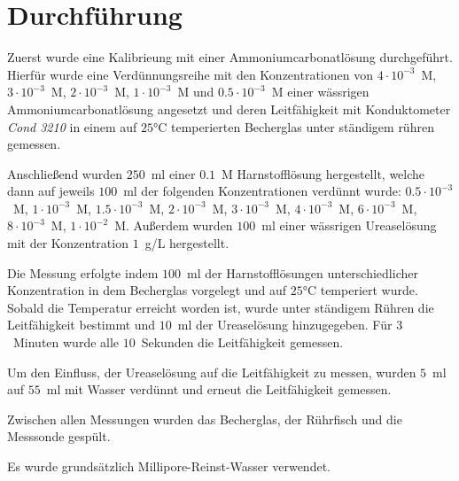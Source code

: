 
 
%
\section{Durchführung}

Zuerst wurde eine Kalibrieung mit einer Ammoniumcarbonatlösung durchgeführt. Hierfür wurde eine Verdünnungsreihe mit den Konzentrationen von $4 \cdot 10^{-3}$~M, $3 \cdot 10^{-3}$~M, $2 \cdot 10^{-3}$~M, $1 \cdot 10^{-3}$~M und $0.5 \cdot 10^{-3}$~M einer wässrigen Ammoniumcarbonatlösung angesetzt und deren Leitfähigkeit mit Konduktometer \textit{Cond 3210} in einem auf $25$°C temperierten Becherglas unter ständigem rühren gemessen.

Anschließend wurden $250$~ml einer $0.1$~M Harnstofflösung hergestellt, welche dann auf jeweils $100$~ml der folgenden Konzentrationen verdünnt wurde:
$0.5 \cdot 10^{-3}$~M, $1 \cdot 10^{-3}$~M, $1.5 \cdot 10^{-3}$~M, $2 \cdot 10^{-3}$~M, $3 \cdot 10^{-3}$~M, $4 \cdot 10^{-3}$~M, $6 \cdot 10^{-3}$~M, $8 \cdot 10^{-3}$~M,  $1 \cdot 10^{-2}$~M. Außerdem wurden $100$~ml einer wässrigen Ureaselösung mit der Konzentration $1$~g/L hergestellt.

Die Messung erfolgte indem $100$~ml der Harnstofflösungen unterschiedlicher Konzentration in dem Becherglas vorgelegt und auf $25$°C temperiert wurde. Sobald die Temperatur erreicht worden ist, wurde unter ständigem Rühren die Leitfähigkeit bestimmt und $10$~ml der Ureaselösung hinzugegeben. Für $3$~Minuten wurde alle $10$~Sekunden die Leitfähigkeit gemessen. 

Um den Einfluss, der Ureaselösung auf die Leitfähigkeit zu messen, wurden $5$~ml auf $55$~ml mit Wasser verdünnt und erneut die Leitfähigkeit gemessen. 

Zwischen allen Messungen wurden das Becherglas, der Rührfisch und die Messsonde gespült.



Es wurde grundsätzlich Millipore-Reinst-Wasser verwendet.











%